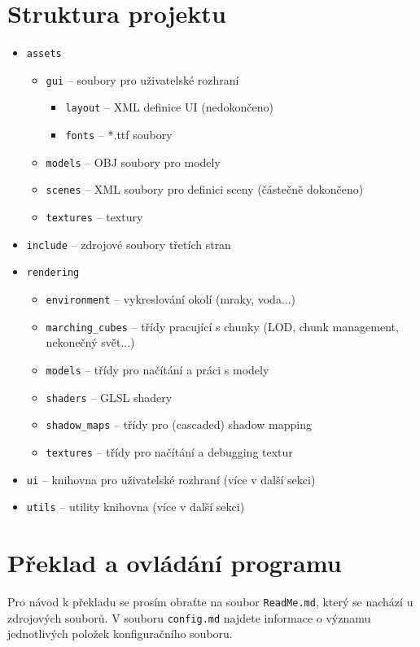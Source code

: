\documentclass[12pt,a4paper,titlepage,final]{report}
\begin{document}
\section{Struktura projektu}
\begin{itemize}
    \item \texttt{assets}
    \begin{itemize}
        \item \texttt{gui} -- soubory pro uživatelské rozhraní
        \begin{itemize}
            \item \texttt{layout} -- XML definice UI (nedokončeno)
            \item \texttt{fonts} -- *.ttf soubory
        \end{itemize}
            \item \texttt{models} -- OBJ soubory pro modely
        \item \texttt{scenes} -- XML soubory pro definici sceny (částečně dokončeno)
        \item \texttt{textures} -- textury
    \end{itemize}
    \item \texttt{include} -- zdrojové soubory třetích stran
    \item \texttt{rendering}
    \begin{itemize}
        \item \texttt{environment} -- vykreslování okolí (mraky, voda...)
        \item \texttt{marching\_cubes} -- třídy pracující s chunky (LOD, chunk management, nekonečný svět...)
        \item \texttt{models} -- třídy pro načítání a práci s modely
        \item \texttt{shaders} -- GLSL shadery
        \item \texttt{shadow\_maps} -- třídy pro (cascaded) shadow mapping
        \item \texttt{textures} -- třídy pro načítání a debugging textur
    \end{itemize}
    \item \texttt{ui} -- knihovna pro uživatelské rozhraní (více v další sekci)
    \item \texttt{utils} -- utility knihovna (více v další sekci)
\end{itemize}

\newpage
\section{Překlad a ovládání programu}
Pro návod k překladu se prosím obraťte na soubor \texttt{ReadMe.md}, který se nachází u zdrojových souborů. V souboru \texttt{config.md} najdete informace o významu jednotlivých položek konfiguračního souboru.
\end{document}
